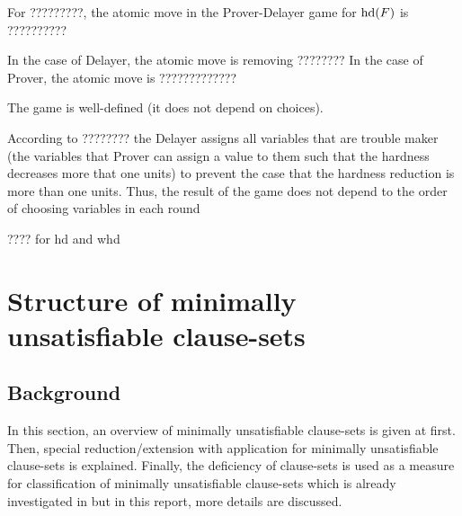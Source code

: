 \documentclass{report}
\begin{document}
\begin{defi}\label{def:atomicmovegraph}
For ?????????, the atomic move in the Prover-Delayer game for $\operatorname{hd}(F)$ is ??????????

In the case of Delayer, the atomic move is removing ????????
In the case of Prover, the atomic move is ?????????????
\end{defi}

\begin{lem}\label{lem:Tseitingame1}
The game is well-defined (it does not depend on choices). 
\end{lem}
\begin{prf}
According to ???????? the Delayer assigns all variables that are trouble maker (the variables that Prover can assign a value to them such that the hardness decreases more that one units) to prevent the case that the hardness reduction is more than one units. Thus, the result of the game does not depend to the order of choosing variables in each round
\end{prf}

\begin{quest}\label{que:game}
???? for hd and whd
\end{quest}
\chapter{Structure of minimally unsatisfiable clause-sets}
\label{cha:mucls}

\section{Background}
\label{sec:basicdef}

In this section, an overview of minimally unsatisfiable clause-sets is given at first. Then, special reduction/extension with application for minimally unsatisfiable clause-sets is explained. Finally, the deficiency of clause-sets is used as a measure for classification of minimally unsatisfiable clause-sets which is already investigated in \cite{KullmannZhao2010Extremal, Kullmann2007HandbuchMU, KullmannZhao2016UHitSAT, KleineBuening2000SubclassesMU, Ku99dK} but in this report, more details are discussed.
\end{document}
